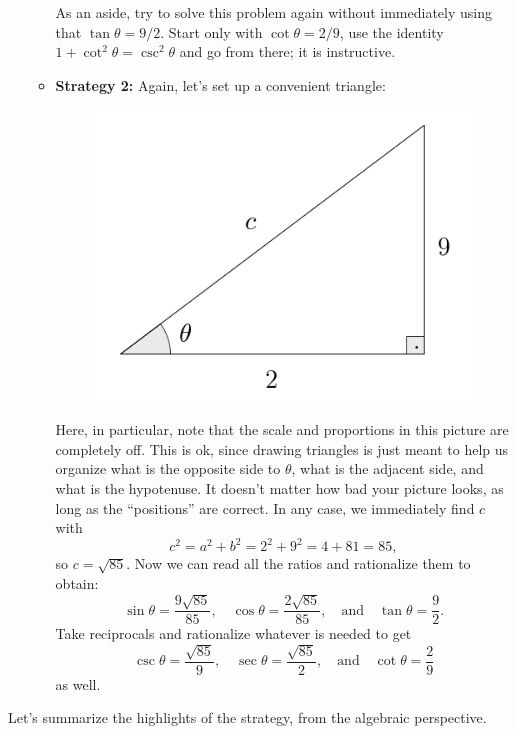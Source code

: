 \documentclass{ximera}
\begin{document}
\begin{example}
\begin{enumerate}[label=\alph*.]
\begin{explanation}
\begin{itemize}
        As an aside, try to solve this problem again without immediately using that $\tan\theta=9/2$. Start only with $\cot\theta =2/9$, use the identity $1+\cot^2\theta=\csc^2\theta$ and go from there; it is instructive.
      \item {\bf Strategy 2:} Again, let's set up a convenient triangle: \begin{figure}[h]
          \centering
          \includegraphics[scale=.3]{./figures/9-1-3-triangle-cot-2-9.png}
        \end{figure} Here, in particular, note that the scale and proportions in this picture are completely off. This is ok, since drawing triangles is just meant to help us organize what is the opposite side to $\theta$, what is the adjacent side, and what is the hypotenuse. It doesn't matter how bad your picture looks, as long as the ``positions'' are correct. In any case, we immediately find $c$ with $$c^2=a^2+b^2=2^2+9^2 = 4+81=85,$$so $c=\sqrt{85}$. Now we can read all the ratios and rationalize them to obtain: $$\sin\theta=\frac{9\sqrt{85}}{85},\quad\cos\theta=\frac{2\sqrt{85}}{85},\quad\mbox{and}\quad\tan\theta=\frac{9}{2}.$$Take reciprocals and rationalize whatever is needed to get $$\csc\theta=\frac{\sqrt{85}}{9},\quad\sec\theta=\frac{\sqrt{85}}{2},\quad\mbox{and}\quad\cot\theta=\frac{2}{9}$$as well.
      \end{itemize}
    \end{explanation}
  \end{enumerate}
\end{example}

Let's summarize the highlights of the strategy, from the algebraic perspective.
\end{document}
